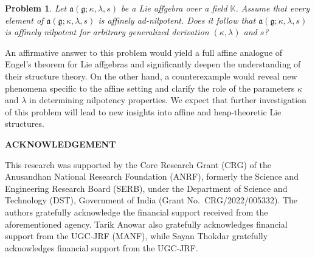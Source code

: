 \documentclass{article}
\newtheorem{problem}{Problem}[section]
\theoremstyle{definition}
\theoremstyle{remark}
\theoremstyle{plain}
\begin{document}
\begin{problem}
Let $\mathfrak{a}(\mathfrak{g};\kappa,\lambda,s)$ be a Lie affgebra over a field
$\mathbb{K}$.
Assume that every element of $\mathfrak{a}(\mathfrak{g};\kappa,\lambda,s)$ is
affinely ad-nilpotent. Does it follow that
$\mathfrak{a}(\mathfrak{g};\kappa,\lambda,s)$ is affinely nilpotent for arbitrary generalized derivation $(\kappa,\lambda)$ and $s$?
\end{problem}

An affirmative answer to this problem would yield a full affine analogue of
Engel’s theorem for Lie affgebras and significantly deepen the understanding of
their structure theory. On the other hand, a counterexample would reveal new
phenomena specific to the affine setting and clarify the role of the parameters
$\kappa$ and $\lambda$ in determining nilpotency properties. We expect that
further investigation of this problem will lead to new insights into affine and
heap-theoretic Lie structures.

\begin{center}
 {\bf ACKNOWLEDGEMENT}
 \end{center}
 
This research was supported by the Core Research Grant (CRG) of the Anusandhan National Research Foundation (ANRF), formerly the Science and Engineering Research Board (SERB), under the Department of Science and Technology (DST), Government of India (Grant No.~CRG/2022/005332). The authors gratefully acknowledge the financial support received from the aforementioned agency. Tarik Anowar also gratefully acknowledges financial support from the UGC-JRF (MANF), while Sayan Thokdar gratefully acknowledges financial support from the UGC-JRF.
\end{document}
